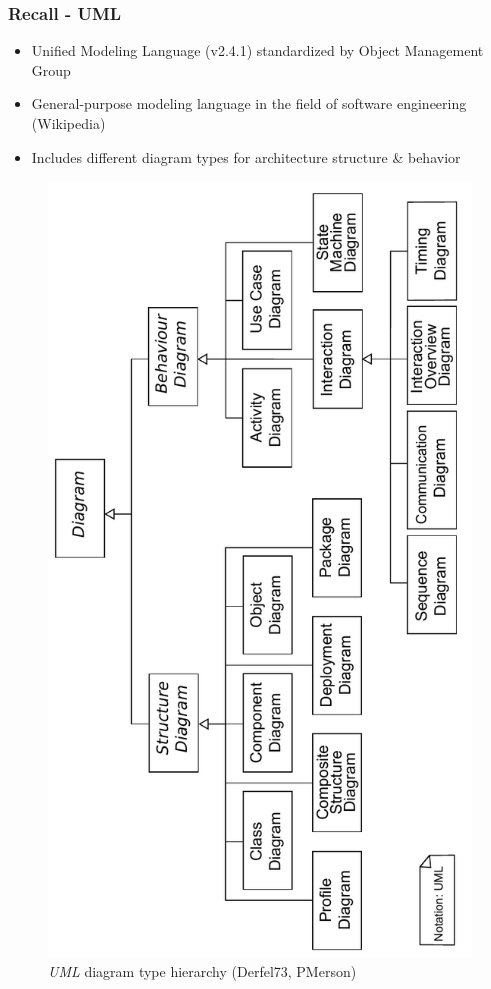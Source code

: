\documentclass{beamer}
\begin{document}
\begin{frame}
 \frametitle{Recall - UML}
 \begin{itemize}
  \item Unified Modeling Language (v2.4.1) standardized by Object Management Group \cite{man:UML}
  \item General-purpose modeling language in the field of software engineering (Wikipedia)
  \item Includes different diagram types for architecture structure \& behavior
 \end{itemize}
\begin{figure}[h!t]
 \centering
 \includegraphics[scale=0.35,angle=270]{images/uml}
 \caption{\textit{UML} diagram type hierarchy (Derfel73, PMerson)}
 \label{fig:uml}
\end{figure}
\end{frame}
\end{document}
